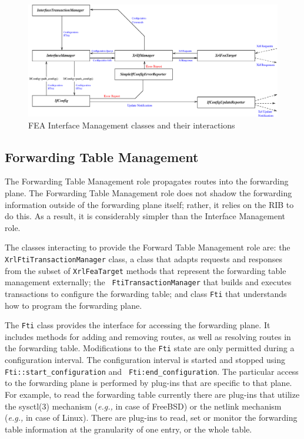 \documentclass[11pt]{article}
\newcommand{\eg}{\emph{e.g.,}\xspace}
\begin{document}
\clearpage
\begin{figure}[htbp]
  \begin{center}
    \includegraphics[angle=90,height=0.90\textheight]{figs/ifi}
    \caption{FEA Interface Management classes and their interactions}
    \label{fig:ifi}
  \end{center}
\end{figure}
\clearpage


\subsection{Forwarding Table Management}

The Forwarding Table Management role propagates routes into the
forwarding plane.  The Forwarding Table Management role does not
shadow the forwarding information outside of the forwarding plane
itself; rather, it relies on the RIB to do this.  As a result, it is
considerably simpler than the Interface Management role.

The classes interacting to provide the Forward Table Management role
are: the {\tt XrlFtiTransactionManager} class, a class that adapts
requests and responses from the subset of {\tt XrlFeaTarget} methods
that represent the forwarding table management externally; the {\tt
FtiTransactionManager} that builds and executes transactions to
configure the forwarding table; and class {\tt Fti} that understands
how to program the forwarding plane.

The {\tt Fti} class provides the interface for accessing the
forwarding plane.  It includes methods for adding and
removing routes, as well as resolving routes in the forwarding table.
Modifications to the {\tt Fti} state are only permitted during a
configuration interval.  The configuration interval is started and
stopped using {\tt Fti::start\_configuration} and {\tt
Fti:end\_configuration}.  The particular access to the forwarding
plane is performed by plug-ins that are specific to that
plane. For example, to read the forwarding table currently there are
plug-ins that utilize the sysctl(3) mechanism (\eg in case of FreeBSD)
or the netlink mechanism (\eg in case of Linux). There are
plug-ins to read, set or monitor the forwarding table information
at the granularity of one entry, or the whole table.
\end{document}
